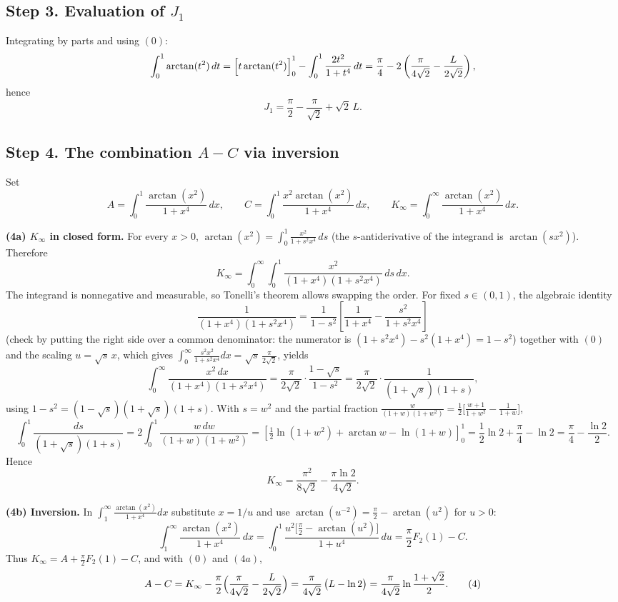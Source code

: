 \documentclass[11pt]{article}
\theoremstyle{remark}
\begin{document}
\subsection*{Step 3. Evaluation of $J_1$}

Integrating by parts and using $(0)$:
\[\int_0^1\arctan(t^2)\,dt=\Bigl[t\arctan(t^2)\Bigr]_0^1-\int_0^1\frac{2t^2}{1+t^4}\,dt
=\frac\pi4-2\left(\frac{\pi}{4\sqrt2}-\frac{L}{2\sqrt2}\right),\]
hence
\begin{equation*}
J_1=\frac\pi2-\frac{\pi}{\sqrt2}+\sqrt2\,L. \tag{3}
\end{equation*}

\subsection*{Step 4. The combination $A-C$ via inversion}

Set
\[A=\int_0^1\frac{\arctan(x^2)}{1+x^4}\,dx,\qquad
C=\int_0^1\frac{x^2\arctan(x^2)}{1+x^4}\,dx,\qquad
K_\infty=\int_0^\infty\frac{\arctan(x^2)}{1+x^4}\,dx .\]

\textbf{(4a) $K_\infty$ in closed form.} For every $x>0$,
$\arctan(x^2)=\int_0^1\frac{x^2}{1+s^2x^4}\,ds$ (the $s$-antiderivative of the integrand is $\arctan(sx^2)$). Therefore
\[K_\infty=\int_0^\infty\!\!\int_0^1\frac{x^2}{(1+x^4)(1+s^2x^4)}\,ds\,dx .\]
The integrand is nonnegative and measurable, so Tonelli's theorem allows swapping the order. For fixed $s\in(0,1)$, the algebraic identity
\[\frac{1}{(1+x^4)(1+s^2x^4)}=\frac{1}{1-s^2}\left[\frac{1}{1+x^4}-\frac{s^2}{1+s^2x^4}\right]\]
(check by putting the right side over a common denominator: the numerator is $(1+s^2x^4)-s^2(1+x^4)=1-s^2$) together with $(0)$ and the scaling $u=\sqrt s\,x$, which gives $\int_0^\infty\frac{s^2x^2}{1+s^2x^4}dx=\sqrt s\,\frac{\pi}{2\sqrt2}$, yields
\[\int_0^\infty\frac{x^2\,dx}{(1+x^4)(1+s^2x^4)}
=\frac{\pi}{2\sqrt2}\cdot\frac{1-\sqrt s}{1-s^2}
=\frac{\pi}{2\sqrt2}\cdot\frac{1}{(1+\sqrt s)(1+s)} ,\]
using $1-s^2=(1-\sqrt s)(1+\sqrt s)(1+s)$. With $s=w^2$ and the partial fraction
$\frac{w}{(1+w)(1+w^2)}=\frac12\bigl[\frac{w+1}{1+w^2}-\frac{1}{1+w}\bigr]$,
\[\int_0^1\frac{ds}{(1+\sqrt s)(1+s)}
=2\int_0^1\frac{w\,dw}{(1+w)(1+w^2)}
=\left[\tfrac12\ln(1+w^2)+\arctan w-\ln(1+w)\right]_0^1
=\frac12\ln2+\frac\pi4-\ln2
=\frac\pi4-\frac{\ln2}{2}.\]
Hence
\begin{equation*}
K_\infty=\frac{\pi^2}{8\sqrt2}-\frac{\pi\ln2}{4\sqrt2}. \tag{4a}
\end{equation*}

\textbf{(4b) Inversion.} In $\int_1^\infty\frac{\arctan(x^2)}{1+x^4}dx$ substitute $x=1/u$ and use $\arctan(u^{-2})=\frac\pi2-\arctan(u^2)$ for $u>0$:
\[\int_1^\infty\frac{\arctan(x^2)}{1+x^4}\,dx
=\int_0^1\frac{u^2\bigl[\frac\pi2-\arctan(u^2)\bigr]}{1+u^4}\,du
=\frac\pi2 F_2(1)-C .\]
Thus $K_\infty=A+\frac{\pi}{2}F_2(1)-C$, and with $(0)$ and $(4a)$,
\begin{equation*}
A-C=K_\infty-\frac\pi2\Bigl(\frac{\pi}{4\sqrt2}-\frac{L}{2\sqrt2}\Bigr)
=\frac{\pi}{4\sqrt2}\,\bigl(L-\ln 2\bigr)
=\frac{\pi}{4\sqrt2}\ln\frac{1+\sqrt2}{2}. \tag{4}
\end{equation*}
\end{document}
